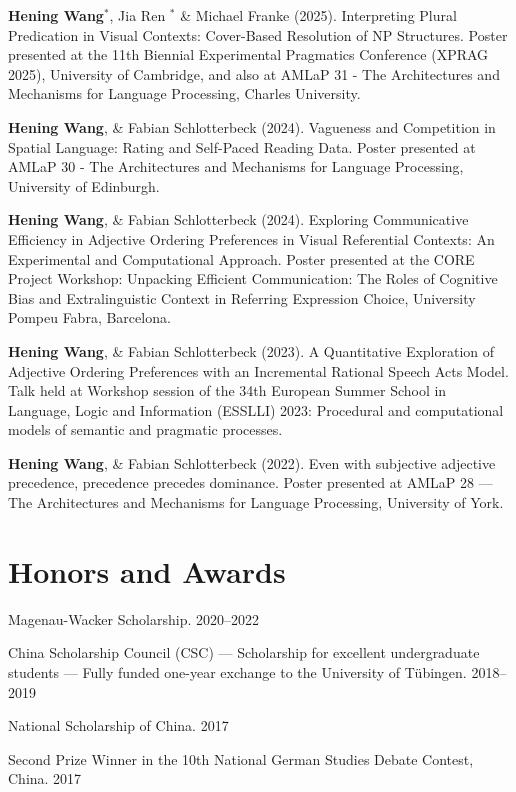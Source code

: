 \documentclass[letterpaper,11pt]{article}
\begin{document}
\begin{description}
    \item {\textbf{Hening Wang$^*$}, Jia Ren $^*$ \&  Michael Franke (2025). Interpreting Plural Predication in Visual Contexts: Cover-Based Resolution of NP Structures. Poster presented at the 11th Biennial Experimental Pragmatics Conference (XPRAG 2025), University of Cambridge, and also at AMLaP 31 - The Architectures and Mechanisms for Language Processing, Charles University.}
    \item {\textbf{Hening Wang}, \& Fabian Schlotterbeck (2024). Vagueness and Competition in Spatial Language: Rating and Self-Paced Reading Data. Poster presented at AMLaP 30 - The Architectures and Mechanisms for Language Processing, University of Edinburgh.}
    \item {\textbf{Hening Wang}, \& Fabian Schlotterbeck (2024). Exploring Communicative Efficiency in Adjective Ordering Preferences in Visual Referential Contexts: An Experimental and Computational Approach. Poster presented at the CORE Project Workshop: Unpacking Efficient Communication: The Roles of Cognitive Bias and Extralinguistic Context in Referring Expression Choice, University Pompeu Fabra, Barcelona. }
    \item {\textbf{Hening Wang}, \& Fabian Schlotterbeck (2023). A Quantitative Exploration of Adjective Ordering Preferences with an Incremental Rational Speech Acts Model. Talk held at Workshop session of the 34th European Summer School in Language, Logic and Information (ESSLLI) 2023: Procedural and computational models of semantic and pragmatic processes.}
    \item {\textbf{Hening Wang}, \& Fabian Schlotterbeck (2022). Even with subjective adjective precedence, precedence precedes dominance. Poster presented at AMLaP 28 --- The Architectures and Mechanisms for Language Processing, University of York.}
\end{description}




\section{Honors and Awards}
\begin{description}[font=$\bullet$]
\item {Magenau-Wacker Scholarship. 2020--2022}
\item {China Scholarship Council (CSC) --- Scholarship for excellent undergraduate students --- Fully funded one-year exchange to the University of Tübingen. 2018--2019}
\item {National Scholarship of China. 2017} 
\item {Second Prize Winner in the 10th National German Studies Debate Contest, China. 2017} 

\end{description}
\end{document}
